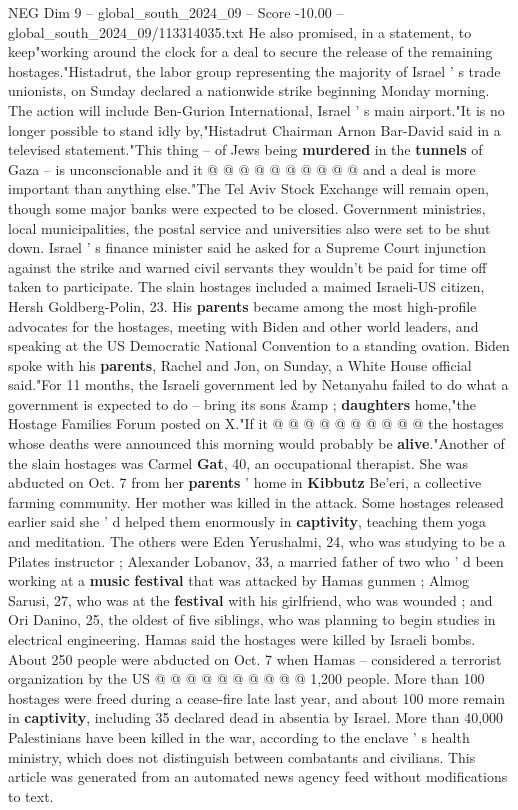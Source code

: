\begin{textsample}{NEG Dim 9 – global\_south\_2024\_09 – Score -10.00 – global\_south\_2024\_09/113314035.txt}
He also promised, in a statement, to keep"working around the clock for a deal to secure the release of the remaining hostages."Histadrut, the labor group representing the majority of Israel ' s trade unionists, on Sunday declared a nationwide strike beginning Monday morning.
The action will include Ben-Gurion International, Israel ' s main airport."It is no longer possible to stand idly by,"Histadrut Chairman Arnon Bar-David said in a televised statement."This thing -- of Jews being \textbf{murdered} in the \textbf{tunnels} of Gaza -- is unconscionable and it @ @ @ @ @ @ @ @ @ @ and a deal is more important than anything else."The Tel Aviv Stock Exchange will remain open, though some major banks were expected to be closed.
Government ministries, local municipalities, the postal service and universities also were set to be shut down.
Israel ' s finance minister said he asked for a Supreme Court injunction against the strike and warned civil servants they wouldn't be paid for time off taken to participate.
The slain hostages included a maimed Israeli-US citizen, Hersh Goldberg-Polin, 23.
His \textbf{parents} became among the most high-profile advocates for the hostages, meeting with Biden and other world leaders, and speaking at the US Democratic National Convention to a standing ovation.
Biden spoke with his \textbf{parents}, Rachel and Jon, on Sunday, a White House official said."For 11 months, the Israeli government led by Netanyahu failed to do what a government is expected to do -- bring its sons \&amp ; \textbf{daughters} home,"the Hostage Families Forum posted on X."If it @ @ @ @ @ @ @ @ @ @ the hostages whose deaths were announced this morning would probably be \textbf{alive}."Another of the slain hostages was Carmel \textbf{Gat}, 40, an occupational therapist.
She was abducted on Oct. 7 from her \textbf{parents} ' home in \textbf{Kibbutz} Be'eri, a collective farming community.
Her mother was killed in the attack.
Some hostages released earlier said she ' d helped them enormously in \textbf{captivity}, teaching them yoga and meditation.
The others were Eden Yerushalmi, 24, who was studying to be a Pilates instructor ; Alexander Lobanov, 33, a married father of two who ' d been working at a \textbf{music} \textbf{festival} that was attacked by Hamas gunmen ; Almog Sarusi, 27, who was at the \textbf{festival} with his girlfriend, who was wounded ; and Ori Danino, 25, the oldest of five siblings, who was planning to begin studies in electrical engineering.
Hamas said the hostages were killed by Israeli bombs.
About 250 people were abducted on Oct. 7 when Hamas -- considered a terrorist organization by the US @ @ @ @ @ @ @ @ @ @ 1,200 people.
More than 100 hostages were freed during a cease-fire late last year, and about 100 more remain in \textbf{captivity}, including 35 declared dead in absentia by Israel.
More than 40,000 Palestinians have been killed in the war, according to the enclave ' s health ministry, which does not distinguish between combatants and civilians.
This article was generated from an automated news agency feed without modifications to text.

\end{textsample}
